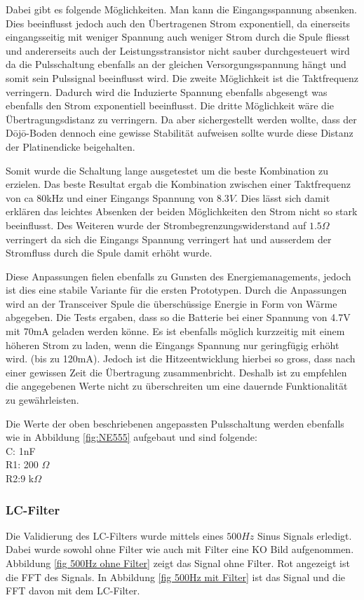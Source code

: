 Dabei gibt es folgende Möglichkeiten. Man kann die Eingangsspannung absenken. Dies beeinflusst jedoch auch den Übertragenen Strom exponentiell, da einerseits eingangsseitig mit weniger Spannung auch weniger Strom durch die Spule fliesst und andererseits auch der Leistungsstransistor nicht sauber durchgesteuert wird da die Pulsschaltung ebenfalls an der gleichen Versorgungsspannung hängt und somit sein Pulssignal beeinflusst wird. Die zweite Möglichkeit ist die Taktfrequenz verringern. Dadurch wird die Induzierte Spannung ebenfalls abgesengt was ebenfalls den Strom exponentiell beeinflusst. Die dritte Möglichkeit wäre die Übertragungsdistanz zu verringern. Da aber sichergestellt werden wollte, dass der Dōjō-Boden dennoch eine gewisse Stabilität aufweisen sollte wurde diese Distanz der Platinendicke beigehalten.

Somit wurde die Schaltung lange ausgetestet um die beste Kombination zu erzielen. Das beste Resultat ergab die Kombination zwischen einer Taktfrequenz von ca 80kHz und einer Eingangs Spannung von $8.3V$. Dies lässt sich damit erklären das leichtes Absenken der beiden Möglichkeiten den Strom nicht so stark beeinflusst. Des Weiteren wurde der Strombegrenzungswiderstand auf $1.5\Omega$ verringert da sich die Eingangs Spannung verringert hat und ausserdem der Stromfluss durch die Spule damit erhöht wurde. 

Diese Anpassungen fielen ebenfalls zu Gunsten des Energiemanagements, jedoch ist dies eine stabile Variante für die ersten Prototypen. Durch die Anpassungen wird an der Transceiver Spule die überschüssige Energie in Form von Wärme  abgegeben. Die Tests ergaben, dass so die Batterie bei einer Spannung von 4.7V mit 70mA geladen werden könne. Es ist ebenfalls möglich kurzzeitig mit einem höheren Strom zu laden, wenn die Eingangs Spannung nur geringfügig erhöht wird. (bis zu 120mA). Jedoch ist die Hitzeentwicklung hierbei so gross, dass nach einer gewissen Zeit die Übertragung zusammenbricht. Deshalb ist zu empfehlen die angegebenen Werte nicht zu überschreiten um eine dauernde Funktionalität zu gewährleisten.

Die Werte der oben beschriebenen angepassten Pulsschaltung werden ebenfalls wie in Abbildung \ref{fig:NE555} aufgebaut und sind folgende:\\
C: 1nF\\
R1: 200 $\Omega$\\
R2:9 k$\Omega$\\


\subsubsection*{LC-Filter} \label{sec:Validierung LC-Filter}
Die Validierung des LC-Filters wurde mittels eines $500Hz$ Sinus Signals erledigt. Dabei wurde sowohl ohne Filter wie auch mit Filter eine KO Bild aufgenommen. Abbildung \ref{fig 500Hz ohne Filter} zeigt das Signal ohne Filter. Rot angezeigt ist die FFT des Signals. In Abbildung \ref{fig 500Hz mit Filter} ist das Signal und die FFT davon mit dem LC-Filter. 


